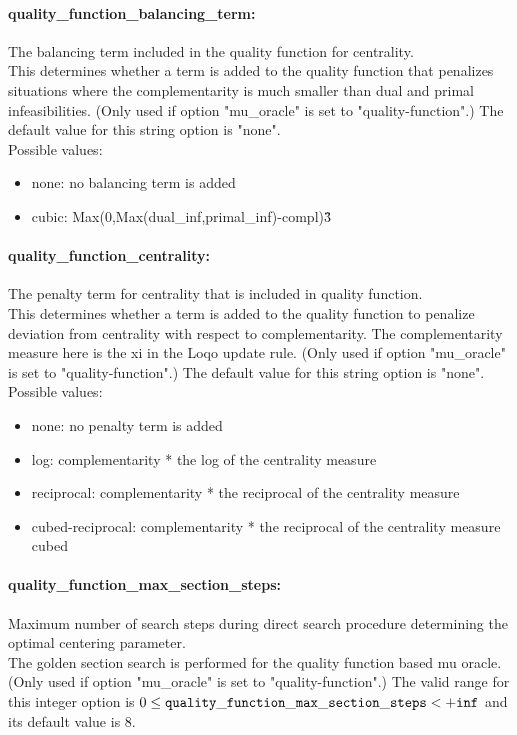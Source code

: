 \paragraph{quality\_function\_balancing\_term:}\label{sec:quality_function_balancing_term} The balancing term included in the quality function for centrality. $\;$ \\
 This determines whether a term is added to the
quality function that penalizes situations where
the complementarity is much smaller than dual and
primal infeasibilities. (Only used if option
"mu\_oracle" is set to "quality-function".)
The default value for this string option is "none".
\\ 
Possible values:
\begin{itemize}
   \item none: no balancing term is added
   \item cubic: Max(0,Max(dual\_inf,primal\_inf)-compl)\^3
\end{itemize}

\paragraph{quality\_function\_centrality:}\label{sec:quality_function_centrality} The penalty term for centrality that is included in quality function. $\;$ \\
 This determines whether a term is added to the
quality function to penalize deviation from
centrality with respect to complementarity.  The
complementarity measure here is the xi in the
Loqo update rule. (Only used if option
"mu\_oracle" is set to "quality-function".)
The default value for this string option is "none".
\\ 
Possible values:
\begin{itemize}
   \item none: no penalty term is added
   \item log: complementarity * the log of the centrality
measure
   \item reciprocal: complementarity * the reciprocal of the
centrality measure
   \item cubed-reciprocal: complementarity * the reciprocal of the
centrality measure cubed
\end{itemize}

\paragraph{quality\_function\_max\_section\_steps:}\label{sec:quality_function_max_section_steps} Maximum number of search steps during direct search procedure determining the optimal centering parameter. $\;$ \\
 The golden section search is performed for the
quality function based mu oracle. (Only used if
option "mu\_oracle" is set to "quality-function".) The valid range for this integer option is
$0 \le {\tt quality\_function\_max\_section\_steps } <  {\tt +inf}$
and its default value is $8$.



